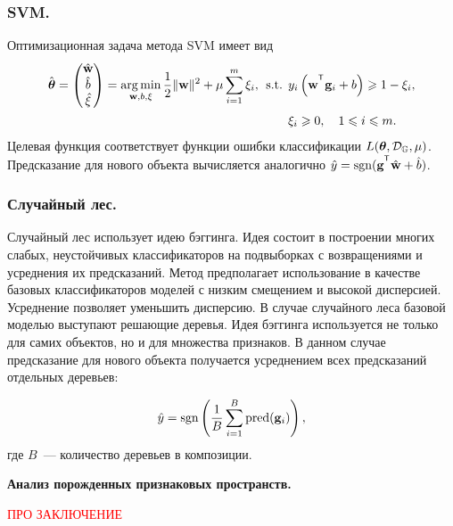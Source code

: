 \documentclass[11pt, a5paper]{dissert}
\begin{document}
\subsubsection{SVM.}
Оптимизационная задача метода SVM имеет вид
\begin{align*}
	\hat{\btheta}  = \begin{pmatrix}
	\hat{\mathbf{w}} \\ \hat{b} \\ \hat{\mathbf{\xi}}
	\end{pmatrix}= \argmin_{\mathbf{w}, b, \mathbf{\xi}}  \frac{1}{2} \|\mathbf{w}\|^2 + \mu \sum_{i=1}^{m} \xi_i,\:\:
	\mbox{s.t.} \:\: &y_i \left(\mathbf{w}^{\T} \mathbf{g}_i + b\right) \geq 1 - \xi_i,\\
	&\xi_i \geq 0, \quad 1 \leq i \leq m.
\end{align*}
Целевая функция соответствует функции ошибки классификации $L(\boldsymbol{\theta}, \mathcal{D}_\mathbb{G}, \mu)$.
Предсказание для нового объекта вычисляется аналогично $
\hat{y} = \sgn (\mathbf{g}^{\T} \hat{\mathbf{w}} + \hat{b})$.

\subsubsection{Случайный лес.}
Случайный лес использует идею бэггинга. 
Идея состоит в построении многих слабых, неустойчивых классификаторов на подвыборках с возвращениями и усреднения их предсказаний.
Метод предполагает использование в качестве базовых классификаторов моделей с низким смещением и высокой дисперсией. 
Усреднение позволяет уменьшить дисперсию.
В случае случайного леса базовой моделью выступают решающие деревья. Идея бэггинга используется не только для самих объектов, но и для множества признаков.
В данном случае предсказание для нового объекта получается усреднением всех предсказаний отдельных деревьев:

\begin{equation*}
	\hat{y} = \operatorname{\mathop{sgn}} \left(\frac{1}{B} \sum_{i=1}^{B} \text{pred}(\mathbf{g}_i) \right),
\end{equation*}
где $B$~--- количество деревьев в композиции.


\textbf{Анализ порожденных признаковых пространств.}
\label{sec:ch6:exp_feature_generation}

\textcolor{red}{ПРО ЗАКЛЮЧЕНИЕ}
\end{document}
